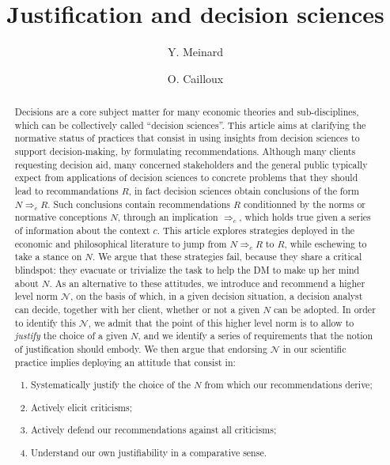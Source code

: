 \documentclass[preprint, french, english, 11pt, authoryear]{elsarticle}%
\newcommand{\adv}{\mathscr{N}}
\begin{document}
\title{Justification and decision sciences}

\author[ld]{Y. Meinard}
\author[ld]{O. Cailloux}
\address[ld]{Universit\'e Paris-Dauphine, PSL Research University, CNRS, UMR [7243], LAMSADE, 75016 PARIS, FRANCE}

\begin{abstract}
Decisions are a core subject matter for many economic theories and sub-disciplines, which can be collectively called “decision sciences”. This article aims at clarifying the normative status of practices that consist in using insights from decision sciences to support decision-making, by formulating recommendations. Although many clients requesting decision aid, many concerned stakeholders and the general public typically expect from applications of decision sciences to concrete problems that they should lead to recommandations $R$, in fact decision sciences obtain conclusions of the form $N ⇒_c R$. Such conclusions contain recommendations $R$ conditionned by the norms or normative conceptions $N$, through  an implication $⇒_c$, which holds true given a series of information about the context $c$. This article explores strategies deployed in the economic and philosophical literature to jump from $N ⇒_c R$ to $R$, while eschewing to take a stance on $N$. We argue that these strategies fail, because they share a critical blindspot: they evacuate or trivialize the task to help the \ac{DM} to make up her mind about $N$. As an alternative to these attitudes, we introduce and recommend a higher level norm $\adv$, on the basis of which, in a given decision situation, a decision analyst can decide, together with her client, whether or not a given $N$ can be adopted. In order to identify this $\adv$, we admit that the point of this higher level norm is to allow to \emph{justify} the choice of a given $N$, and we identify a series of requirements that the notion of justification should embody. We then argue that endorsing $\adv$ in our scientific practice implies deploying an attitude that consist in:
\begin{enumerate}[label=\roman*.]
	\item Systematically justify the choice of the $N$ from which our recommendations derive;
	\item Actively elicit criticisms;
	\item Actively defend our recommendations against all criticisms;
	\item Understand our own justifiability in a comparative sense.
\end{enumerate}
\end{abstract}
\end{document}
